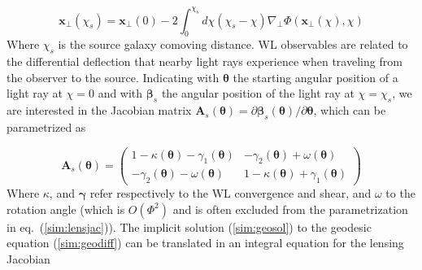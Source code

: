 \documentclass[reprint,aps,prd,superscriptaddress,showkeys,showpacs]{revtex4-1}
\newcommand{\bb}[1]{\mathbf{#1}}
\newcommand\pt{\pmb{\theta}}
\begin{document}
\begin{equation}
\label{sim:geosol}
\bb{x}_\perp(\chi_s) = \bb{x}_\perp(0) -2\int_0^{\chi_s} d\chi (\chi_s-\chi) \nabla_\perp \Phi(\bb{x}_\perp(\chi),\chi)
\end{equation}
%
Where $\chi_s$ is the source galaxy comoving distance. WL observables are related to the differential deflection that nearby light rays experience when traveling from the observer to the source. Indicating with $\pt$ the starting angular position of a light ray at $\chi=0$ and with $\pmb{\beta}_s$ the angular position of the light ray at $\chi=\chi_s$, we are interested in the Jacobian matrix $\bb{A}_s(\pt)=\partial\pmb{\beta}_s(\pt)/\partial \pt$, which can be parametrized as 

\begin{equation}
\label{sim:lensjac}
\bb{A}_s(\pt) = 
\begin{pmatrix}
%
1-\kappa(\pt)-\gamma_1(\pt) & -\gamma_2(\pt) + \omega(\pt) \\
-\gamma_2(\pt) - \omega(\pt) & 1-\kappa(\pt)+\gamma_1(\pt)
\end{pmatrix}
\end{equation}
%
Where $\kappa$, and $\pmb{\gamma}$ refer respectively to the WL
convergence and shear, and $\omega$ to the rotation angle (which is
$O(\Phi^2)$ and is often excluded from the parametrization in eq.~(\ref{sim:lensjac})).  The implicit solution
(\ref{sim:geosol}) to the geodesic equation (\ref{sim:geodiff}) can be
translated in an integral equation for the lensing Jacobian
\end{document}
